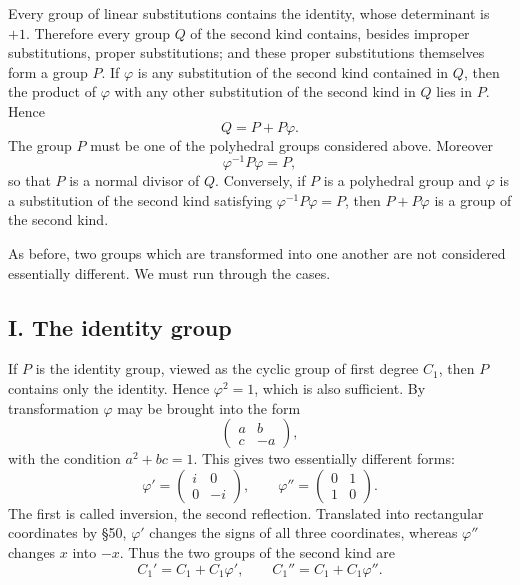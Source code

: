 \documentclass[11pt]{article}
\begin{document}
Every group of linear substitutions contains the identity, whose determinant is \(+1\).  Therefore every group \(Q\) of the second kind contains, besides improper substitutions, proper substitutions; and these proper substitutions themselves form a group \(P\).  If \(\varphi\) is any substitution of the second kind contained in \(Q\), then the product of \(\varphi\) with any other substitution of the second kind in \(Q\) lies in \(P\).  Hence
\begin{equation}\label{eq:62-1}
 Q=P+P\varphi.
\end{equation}
The group \(P\) must be one of the polyhedral groups considered above.  Moreover
\[
 \varphi^{-1}P\varphi=P,
\]
so that \(P\) is a normal divisor of \(Q\).  Conversely, if \(P\) is a polyhedral group and \(\varphi\) is a substitution of the second kind satisfying \(\varphi^{-1}P\varphi=P\), then \(P+P\varphi\) is a group of the second kind.

As before, two groups which are transformed into one another are not considered essentially different.  We must run through the cases.

\subsection*{I. The identity group}

If \(P\) is the identity group, viewed as the cyclic group of first degree \(C_1\), then \(P\) contains only the identity.  Hence \(\varphi^2=1\), which is also sufficient.  By transformation \(\varphi\) may be brought into the form
\[
 \begin{pmatrix}a&b\\c&-a\end{pmatrix},
\]
with the condition \(a^2+bc=1\).  This gives two essentially different forms:
\begin{equation}\label{eq:62-2}
 \varphi'=\begin{pmatrix}i&0\\0&-i\end{pmatrix},
 \qquad
 \varphi''=\begin{pmatrix}0&1\\1&0\end{pmatrix}.
\end{equation}
The first is called inversion, the second reflection.  Translated into rectangular coordinates by \S 50, \(\varphi'\) changes the signs of all three coordinates, whereas \(\varphi''\) changes \(x\) into \(-x\).  Thus the two groups of the second kind are
\[
 C_1'=C_1+C_1\varphi',
 \qquad
 C_1''=C_1+C_1\varphi''.
\]
\end{document}
